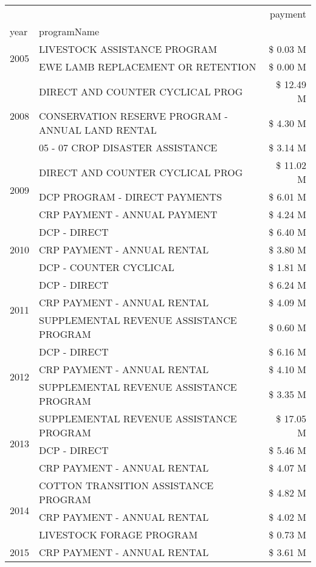 \begin{tabular}{llr}
\toprule
 &  & payment \\
year & programName &  \\
\midrule
\multirow[t]{2}{*}{2005} & LIVESTOCK ASSISTANCE PROGRAM & \$ 0.03 M \\
 & EWE LAMB REPLACEMENT OR RETENTION & \$ 0.00 M \\
\cline{1-3}
\multirow[t]{3}{*}{2008} & DIRECT AND COUNTER CYCLICAL PROG & \$ 12.49 M \\
 & CONSERVATION RESERVE PROGRAM - ANNUAL LAND RENTAL & \$ 4.30 M \\
 & 05 - 07 CROP DISASTER ASSISTANCE & \$ 3.14 M \\
\cline{1-3}
\multirow[t]{3}{*}{2009} & DIRECT AND COUNTER CYCLICAL PROG & \$ 11.02 M \\
 & DCP PROGRAM - DIRECT PAYMENTS & \$ 6.01 M \\
 & CRP PAYMENT - ANNUAL PAYMENT & \$ 4.24 M \\
\cline{1-3}
\multirow[t]{3}{*}{2010} & DCP - DIRECT & \$ 6.40 M \\
 & CRP PAYMENT - ANNUAL RENTAL & \$ 3.80 M \\
 & DCP - COUNTER CYCLICAL & \$ 1.81 M \\
\cline{1-3}
\multirow[t]{3}{*}{2011} & DCP - DIRECT & \$ 6.24 M \\
 & CRP PAYMENT - ANNUAL RENTAL & \$ 4.09 M \\
 & SUPPLEMENTAL REVENUE ASSISTANCE PROGRAM & \$ 0.60 M \\
\cline{1-3}
\multirow[t]{3}{*}{2012} & DCP - DIRECT & \$ 6.16 M \\
 & CRP PAYMENT - ANNUAL RENTAL & \$ 4.10 M \\
 & SUPPLEMENTAL REVENUE ASSISTANCE PROGRAM & \$ 3.35 M \\
\cline{1-3}
\multirow[t]{3}{*}{2013} & SUPPLEMENTAL REVENUE ASSISTANCE PROGRAM & \$ 17.05 M \\
 & DCP - DIRECT & \$ 5.46 M \\
 & CRP PAYMENT - ANNUAL RENTAL & \$ 4.07 M \\
\cline{1-3}
\multirow[t]{3}{*}{2014} & COTTON TRANSITION ASSISTANCE PROGRAM & \$ 4.82 M \\
 & CRP PAYMENT - ANNUAL RENTAL & \$ 4.02 M \\
 & LIVESTOCK FORAGE PROGRAM & \$ 0.73 M \\
\cline{1-3}
\multirow[t]{3}{*}{2015} & CRP PAYMENT - ANNUAL RENTAL & \$ 3.61 M \\

\end{tabular}
